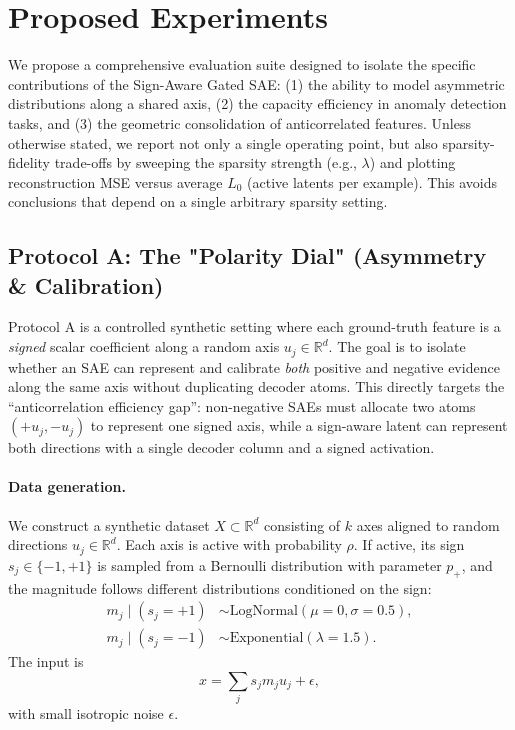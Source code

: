 \documentclass{article}
\begin{document}
\section{Proposed Experiments}

We propose a comprehensive evaluation suite designed to isolate the specific contributions of the Sign-Aware Gated SAE: (1) the ability to model asymmetric distributions along a shared axis, (2) the capacity efficiency in anomaly detection tasks, and (3) the geometric consolidation of anticorrelated features.
Unless otherwise stated, we report not only a single operating point, but also sparsity-fidelity trade-offs by sweeping the sparsity strength (e.g., $\lambda$) and plotting reconstruction MSE versus average $L_0$ (active latents per example). This avoids conclusions that depend on a single arbitrary sparsity setting.


\subsection{Protocol A: The "Polarity Dial" (Asymmetry \& Calibration)}
\label{sec:protocol_a}

Protocol A is a controlled synthetic setting where each ground-truth feature is a \emph{signed} scalar coefficient along a
random axis $u_j \in \mathbb{R}^d$. The goal is to isolate whether an SAE can represent and calibrate \emph{both} positive and
negative evidence along the same axis without duplicating decoder atoms. This directly targets the ``anticorrelation efficiency
gap'': non-negative SAEs must allocate two atoms $(+u_j,-u_j)$ to represent one signed axis, while a sign-aware latent can
represent both directions with a single decoder column and a signed activation.

\paragraph{Data generation.}
We construct a synthetic dataset $X \subset \mathbb{R}^d$ consisting of $k$ axes aligned to random directions
$u_j \in \mathbb{R}^d$. Each axis is active with probability $\rho$. If active, its sign $s_j \in \{-1, +1\}$ is sampled from
a Bernoulli distribution with parameter $p_+$, and the magnitude follows different distributions conditioned on the sign:
\begin{align}
    m_j \mid (s_j=+1) &\sim \text{LogNormal}(\mu=0, \sigma=0.5), \\
    m_j \mid (s_j=-1) &\sim \text{Exponential}(\lambda=1.5).
\end{align}
The input is
\begin{equation}
    x = \sum_j s_j m_j u_j + \epsilon,
\end{equation}
with small isotropic noise $\epsilon$.
\end{document}
